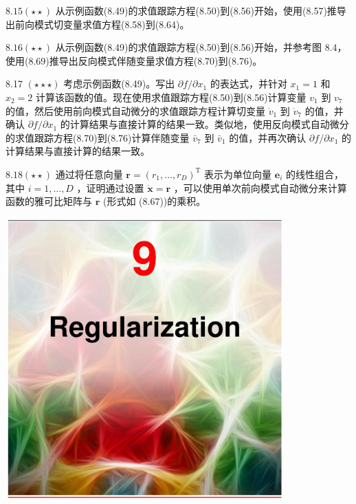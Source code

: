 \documentclass[10pt]{report}
\begin{document}
\({8.15}\left( {\star  \star  }\right)\) 从示例函数(8.49)的求值跟踪方程(8.50)到(8.56)开始，使用(8.57)推导出前向模式切变量求值方程(8.58)到(8.64)。

\({8.16}\left( {\star  \star  }\right)\) 从示例函数(8.49)的求值跟踪方程(8.50)到(8.56)开始，并参考图 8.4，使用(8.69)推导出反向模式伴随变量求值方程(8.70)到(8.76)。

8.17 \(\left( {\star  \star   \star  }\right)\) 考虑示例函数(8.49)。写出 \(\partial f/\partial {x}_{1}\) 的表达式，并针对 \({x}_{1} = 1\) 和 \({x}_{2} = 2\) 计算该函数的值。现在使用求值跟踪方程(8.50)到(8.56)计算变量 \({v}_{1}\) 到 \({v}_{7}\) 的值，然后使用前向模式自动微分的求值跟踪方程计算切变量 \({\dot{v}}_{1}\) 到 \({\dot{v}}_{7}\) 的值，并确认 \(\partial f/\partial {x}_{1}\) 的计算结果与直接计算的结果一致。类似地，使用反向模式自动微分的求值跟踪方程(8.70)到(8.76)计算伴随变量 \({\bar{v}}_{7}\) 到 \({\bar{v}}_{1}\) 的值，并再次确认 \(\partial f/\partial {x}_{1}\) 的计算结果与直接计算的结果一致。

\({8.18}\left( {\star  \star  }\right)\) 通过将任意向量 \(\mathbf{r} = {\left( {r}_{1},\ldots ,{r}_{D}\right) }^{\mathrm{T}}\) 表示为单位向量 \({\mathbf{e}}_{i}\) 的线性组合，其中 \(i = 1,\ldots ,D\) ，证明通过设置 \(\dot{\mathbf{x}} = \mathbf{r}\) ，可以使用单次前向模式自动微分来计算函数的雅可比矩阵与 \(\mathbf{r}\) (形式如 (8.67))的乘积。

\begin{center}
\includegraphics[max width=0.8\textwidth]{images/0194e279-9b28-703a-88f4-c3ac21e2010d_272_472_348_1077_1090_0.jpg}
\end{center}
\hspace*{3em} 
\end{document}
